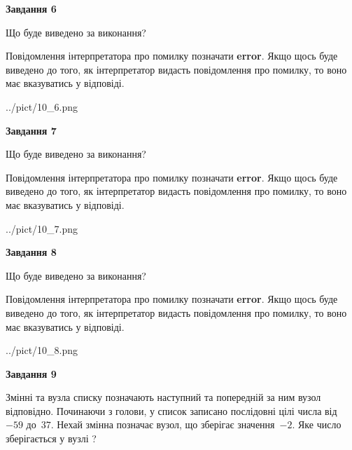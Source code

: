 \documentclass[12pt, ukrainian]{article}
\begin{document}
{\begin {large}
{\begin {center}\textbf{Завдання 6}\end {center}}\par
Що буде виведено за виконання?

Повідомлення інтерпретатора про помилку позначати \textbf{error}.
Якщо щось буде виведено до того, як інтерпретатор видасть повідомлення про помилку, 
то воно має вказуватись у відповіді. \par


\begin{center}
	{../pict/10_6.png}
\end{center}
\newpage

{\begin {center}\textbf{Завдання 7}\end {center}}\par
Що буде виведено за виконання?

Повідомлення інтерпретатора про помилку позначати \textbf{error}.
Якщо щось буде виведено до того, як інтерпретатор видасть повідомлення про помилку, 
то воно має вказуватись у відповіді. \par


\begin{center}
	{../pict/10_7.png}
\end{center}
\newpage

{\begin {center}\textbf{Завдання 8}\end {center}}\par
Що буде виведено за виконання?

Повідомлення інтерпретатора про помилку позначати \textbf{error}.
Якщо щось буде виведено до того, як інтерпретатор видасть повідомлення про помилку, 
то воно має вказуватись у відповіді. \par


\begin{center}
	{../pict/10_8.png}
\end{center}
\newpage

{\begin {center}\textbf{Завдання 9}\end {center}}\par
Змінні  та  вузла списку позначають наступний та попередній за ним вузол відповідно. Починаючи з голови, у список записано послідовні цілі числа від~$-59$ до~$37$. Нехай змінна  позначає вузол, що зберігає значення~$-2$.
Яке число зберігається у вузлі  ?\par
\newpage


\end{large}}
\end{document}
